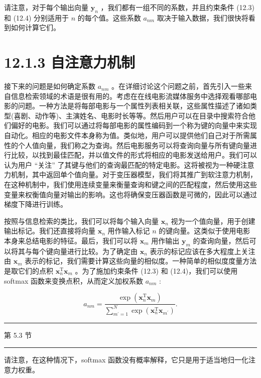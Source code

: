 \documentclass[10pt]{article}
\newcommand{\HRule}{\begin{center}\rule{0.9\linewidth}{0.2mm}\end{center}}
\begin{document}
请注意，对于每个输出向量 \({\mathbf{y}}_{n}\) ，我们都有一组不同的系数，并且约束条件 (12.3) 和 (12.4) 分别适用于 \(n\) 的每个值。这些系数 \({a}_{nm}\) 取决于输入数据，我们很快将看到如何计算它们。

\section*{12.1.3 自注意力机制}

接下来的问题是如何确定系数 \({a}_{nm}\) 。在详细讨论这个问题之前，首先引入一些来自信息检索领域的术语是很有用的。考虑在在线电影流媒体服务中选择观看哪部电影的问题。一种方法是将每部电影与一个属性列表相关联，这些属性描述了诸如类型(喜剧、动作等)、主演姓名、电影时长等等。然后用户可以在目录中搜索符合他们偏好的电影。我们可以通过将每部电影的属性编码到一个称为键的向量中来实现自动化。相应的电影文件本身称为值。类似地，用户可以提供他们自己对于所需属性的个人值向量，我们称之为查询。然后电影服务可以将查询向量与所有键向量进行比较，以找到最佳匹配，并以值文件的形式将相应的电影发送给用户。我们可以认为用户 “关注” 了其键与他们的查询最匹配的特定电影。这将被视为一种硬注意力机制，其中返回单个值向量。对于变压器模型，我们将其推广到软注意力机制，在这种机制中，我们使用连续变量来衡量查询和键之间的匹配程度，然后使用这些变量来权衡值向量对输出的影响。这也将确保变压器函数是可微的，因此可以通过梯度下降进行训练。

按照与信息检索的类比，我们可以将每个输入向量 \({\mathbf{x}}_{n}\) 视为一个值向量，用于创建输出标记。我们还直接将向量 \({\mathbf{x}}_{n}\) 用作输入标记 \(n\) 的键向量。这类似于使用电影本身来总结电影的特征。最后，我们可以将 \({\mathbf{x}}_{m}\) 用作输出 \({\mathbf{y}}_{m}\) 的查询向量，然后可以将其与每个键向量进行比较。为了确定由 \({\mathbf{x}}_{n}\) 表示的标记应该在多大程度上关注由 \({\mathbf{x}}_{m}\) 表示的标记，我们需要计算这些向量的相似度。一种简单的相似度度量方法是取它们的点积 \({\mathbf{x}}_{n}^{\mathrm{T}}{\mathbf{x}}_{m}\) 。为了施加约束条件 (12.3) 和 (12.4)，我们可以使用 softmax 函数来变换点积，从而定义加权系数 \({a}_{nm}\) :

\[
{a}_{nm} = \frac{\exp \left( {{\mathbf{x}}_{n}^{\mathrm{T}}{\mathbf{x}}_{m}}\right) }{\mathop{\sum }\limits_{{{m}^{\prime } = 1}}^{N}\exp \left( {{\mathbf{x}}_{n}^{\mathrm{T}}{\mathbf{x}}_{{m}^{\prime }}}\right) }. \tag{12.5}
\]

\HRule

第 5.3 节

\HRule

请注意，在这种情况下，softmax 函数没有概率解释，它只是用于适当地归一化注意力权重。
\end{document}
